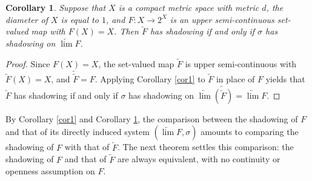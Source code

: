 \documentclass[12pt]{amsart}
\newtheorem{corollary}[theorem]{Corollary}
\theoremstyle{definition}
\begin{document}
\begin{corollary}\label{cor2}
	Suppose that $X$ is a compact metric space with metric $d$, the diameter of $X$ is equal to $1$, and $F:X\rightarrow 2^X$ is an upper semi-continuous set-valued map with $F(X)=X$. Then $\underleftarrow{F}$ has shadowing if and only if $\sigma$ has shadowing on $\underleftarrow{\lim} F$.
\end{corollary}
\begin{proof}
	Since $F(X)=X$, the set-valued map $\underleftarrow{F}$ is upper semi-continuous with $\underleftarrow{F}(X)=X$, and $\underleftarrow{\underleftarrow{F}}=F$. Applying Corollary \ref{cor1} to $\underleftarrow{F}$ in place of $F$ yields that $\underleftarrow{F}$ has shadowing if and only if $\sigma$ has shadowing on $\underleftarrow{\lim} \underleftarrow{(\underleftarrow{F})}=\underleftarrow{\lim} F$.
\end{proof}

By Corollary \ref{cor1} and Corollary \ref{cor2}, the comparison between the shadowing of $F$ and that of its directly induced system $(\underleftarrow{\lim} F,\sigma)$ amounts to comparing the shadowing of $F$ with that of $\underleftarrow{F}$. The next theorem settles this comparison: the shadowing of $F$ and that of $\underleftarrow{F}$ are always equivalent, with no continuity or openness assumption on $F$.
\end{document}
